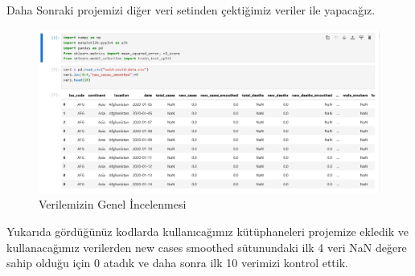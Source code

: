 \documentclass[12pt, a4paper]{article}
\begin{document}
\newline Daha Sonraki projemizi diğer veri setinden çektiğimiz veriler ile yapacağız.\cite{owidcoronavirus}
\begin{figure}[!htbp] 
	
	\centering
	\includegraphics[angle=0, width=\textwidth]{1.png}
	\caption{Verilemizin Genel İncelenmesi}
	
	
\end{figure} 
\newline   Yukarıda gördüğünüz kodlarda kullanıcağımız kütüphaneleri projemize ekledik ve kullanacağımız verilerden new cases smoothed sütunundaki ilk 4 veri NaN değere sahip olduğu için 0 atadık ve daha sonra ilk 10 verimizi kontrol ettik.
\end{document}
